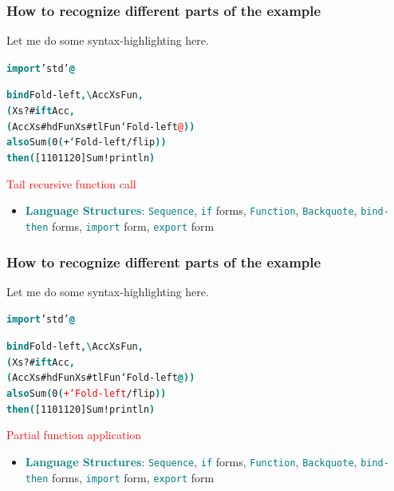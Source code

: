 \documentclass[10pt, compress, handout]{beamer}
\newcommand{\sst}[1]{\textcolor{teal}{\textbf{#1}}}
\newcommand{\msst}[1]{\textcolor{teal}{\texttt{#1}}}
\begin{document}
\begin{frame}[fragile]
  \frametitle{How to recognize different parts of the example}

  Let me do some syntax-highlighting here.

  \begin{alltt}
  \sst{import} 'std' \sst{@}

  \sst{bind} Fold-left \sst{,\textbackslash} Acc Xs Fun\sst{,}
    \sst{(}Xs ?# \sst{ift} Acc\sst{,}
       \sst{(}Acc Xs #hd Fun Xs #tl Fun\sst{`} Fold-left\textcolor{red}{@}\sst{))}
  \sst{also} Sum \sst{(}0 \sst{(}+\sst{`} Fold-left /flip\sst{))}
  \sst{then} \sst{(}[1 10 11 20] Sum !println\sst{)}
  \end{alltt}

\vspace{-0.16cm}
\textcolor{red}{Tail recursive function call}

  \begin{itemize}
  \item \sst{Language Structures}:
\small
\msst{Sequence}, \msst{if} forms, \msst{Function}, \msst{Backquote}, \msst{bind-then} forms, \msst{import} form, \msst{export} form
\normalsize
  \end{itemize}
\vspace{0.3cm}

\end{frame}

\begin{frame}[fragile]
  \frametitle{How to recognize different parts of the example}

  Let me do some syntax-highlighting here.

  \begin{alltt}
  \sst{import} 'std' \sst{@}

  \sst{bind} Fold-left \sst{,\textbackslash} Acc Xs Fun\sst{,}
    \sst{(}Xs ?# \sst{ift} Acc\sst{,}
       \sst{(}Acc Xs #hd Fun Xs #tl Fun\sst{`} Fold-left\sst{@))}
  \sst{also} Sum \sst{(}0 \sst{(}\textcolor{red}{+` Fold-left} /flip\sst{))}
  \sst{then} \sst{(}[1 10 11 20] Sum !println\sst{)}
  \end{alltt}

\vspace{-0.16cm}
\textcolor{red}{Partial function application}

  \begin{itemize}
  \item \sst{Language Structures}:
\small
\msst{Sequence}, \msst{if} forms, \msst{Function}, \msst{Backquote}, \msst{bind-then} forms, \msst{import} form, \msst{export} form
\normalsize
  \end{itemize}
\vspace{0.3cm}

\end{frame}
\end{document}

